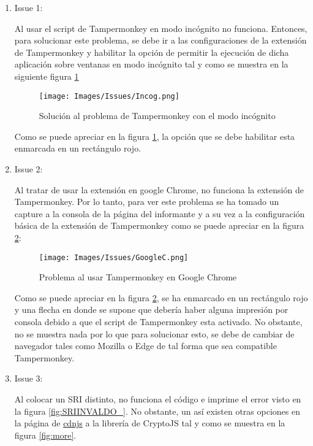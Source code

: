 \documentclass[letter,12pt]{article}
\begin{document}
\begin{enumerate}
    \item Issue 1:

Al usar el script de Tampermonkey en modo incógnito no funciona. Entonces, para solucionar este problema, se debe ir a las configuraciones de la extensión de Tampermonkey y habilitar la opción de permitir la ejecución de dicha aplicación sobre ventanas en modo incógnito tal y como se muestra en la siguiente figura \ref{fig:Incog}

\begin{figure}[H]
    \centering
    \texttt{[image: Images/Issues/Incog.png]}
    \caption{Solución al problema de Tampermonkey con el modo incógnito}
    \label{fig:Incog}
\end{figure}

Como se puede apreciar en la figura \ref{fig:Incog}, la opción que se debe habilitar esta enmarcada en un rectángulo rojo.

\clearpage

\item Issue 2:

Al tratar de usar la extensión en google Chrome, no funciona la extensión de Tampermonkey. Por lo tanto, para ver este problema se ha tomado un capture a la consola de la página del informante y a su vez a la configuración básica de la extensión de Tampermonkey como se puede apreciar en la figura \ref{fig:GoogleC}:

\begin{figure}[H]
    \centering
    \texttt{[image: Images/Issues/GoogleC.png]}
    \caption{Problema al usar Tampermonkey en Google Chrome}
    \label{fig:GoogleC}
\end{figure}

Como se puede apreciar en la figura \ref{fig:GoogleC}, se ha enmarcado en un rectángulo rojo y una flecha en donde se supone que debería haber alguna impresión por consola debido a que el script de Tampermonkey esta activado. No obstante, no se muestra nada por lo que para solucionar esto, se debe de cambiar de navegador tales como Mozilla o Edge de tal forma que sea compatible Tampermonkey.

\clearpage


\item Issue 3:

Al colocar un SRI distinto, no funciona el código e imprime el error visto en la figura \ref{fig:SRIINVALDO_}. No obstante, un así existen otras opciones en la página de \href{https://cdnjs.com/libraries/crypto-js}{cdnjs} a la librería de CryptoJS tal y como se muestra en la figura \ref{fig:more}.


\end{enumerate}
\end{document}
